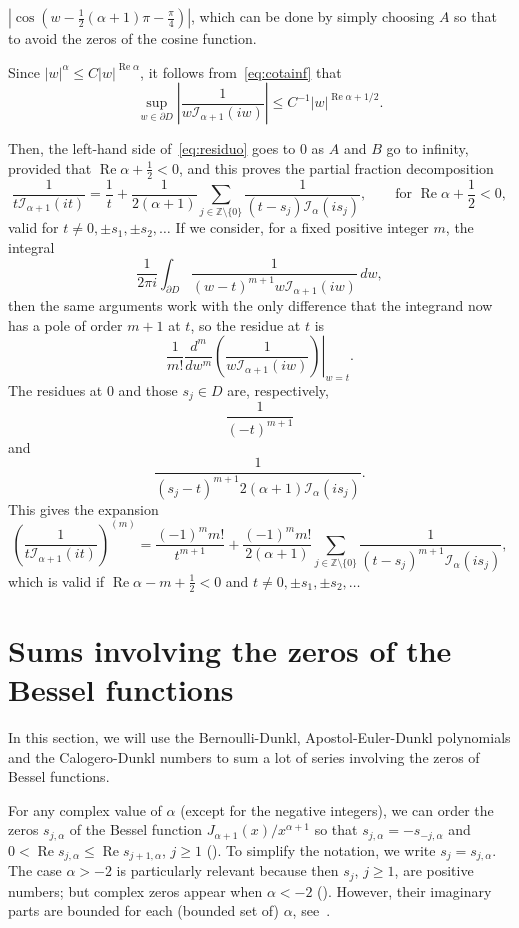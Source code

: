 \documentclass[10pt,a4paper]{article}
\theoremstyle{plain}
\theoremstyle{definition}
\numberwithin{equation}{section} %
\newcommand{\I}{\mathcal{I}}
\newcommand{\ZZO}{\mathbb{Z} \setminus \{0\}}
\renewcommand{\Re}{\operatorname{Re}}
\begin{document}
$|\cos (w-\frac{1}{2}(\alpha+1)\pi - \frac{\pi}{4})|$,
which can be done by simply choosing $A$ so that to avoid the zeros of the cosine function.

Since $|w|^\alpha \leq C|w|^{\Re \alpha}$, it follows from~\eqref{eq:cotainf} that
\[
   \sup_{w \in \partial D} \left|
   \frac{1}{w \I_{\alpha+1}(iw)} \right|
   \leq C^{-1} |w|^{\Re\alpha+1/2}.
\]

Then, the left-hand side of~\eqref{eq:residuo} goes to $0$ as $A$ and $B$ go to infinity, provided that $\Re\alpha + \frac{1}{2} < 0$, and this proves the partial fraction decomposition
\[
   \frac{1}{t \I_{\alpha+1}(it)} = \frac{1}{t}
   + \frac{1}{2(\alpha+1)}
   \sum_{j \in \ZZO}
   \frac{1}{(t - s_j) \I_{\alpha}(is_j)},
   \qquad \text{for } \Re\alpha + \frac{1}{2} < 0,
\]
valid for $t \not= 0, \pm s_1, \pm s_2, \dots$
If we consider, for a fixed positive integer $m$, the integral
\[
   \frac{1}{2\pi i} \int_{\partial D}
   \frac{1}{(w-t)^{m+1} w \I_{\alpha+1}(iw)} \, dw,
\]
then the same arguments work with the only difference that the integrand now has a pole of order $m+1$ at $t$, so the residue at $t$ is
\[
   \frac{1}{m!} \left.\frac{d^m}{d w^m} \left(
   \frac{1}{w \I_{\alpha+1}(iw)} \right) \right|_{w=t}.
\]
The residues at $0$ and those $s_j \in D$ are, respectively,
\[
    \frac{1}{(-t)^{m+1}}
\]
and
\[
   \frac{1}{(s_j - t)^{m+1} 2(\alpha+1) \I_{\alpha}(is_j)}.
\]
This gives the expansion
\begin{equation}
\label{eq:pfd2}
 \left(
   \frac{1}{t \I_{\alpha+1}(it)} \right) ^{(m)}
   = \frac{(-1)^m m!}{t^{m+1}}
   + \frac{(-1)^m m!}{2(\alpha+1)}
   \sum_{j \in \ZZO}
   \frac{1}{(t - s_j)^{m+1} \I_{\alpha}(is_j)},
\end{equation}
which is valid if $\Re\alpha - m + \frac{1}{2} < 0$ and $t \not= 0, \pm s_1, \pm s_2, \dots$

\section{Sums involving the zeros of the Bessel functions}
\label{sec:serieszeros}

In this section, we will use the Bernoulli-Dunkl, Apostol-Euler-Dunkl polynomials and the Calogero-Dunkl numbers to sum a lot of series involving the zeros of Bessel functions.

For any complex value of $\alpha$ (except for the negative integers), we can order the zeros $s_{j,\alpha}$ of the Bessel function $J_{\alpha+1}(x)/x^{\alpha+1}$ so that $s_{j,\alpha}=-s_{-j,\alpha}$ and $0<\Re s_{j,\alpha}\le \Re s_{j+1,\alpha}$, $j\ge 1$ (\cite[\S\,15.41, p.~497]{Wat}). To simplify the notation, we write $s_j=s_{j,\alpha}$.
The case $\alpha>-2$ is particularly relevant because then $s_j$, $j\ge 1$, are positive numbers; but complex zeros appear when $\alpha<-2$ (\cite[\S\,15.27, p.~483]{Wat}). However, their imaginary parts are bounded for each (bounded set of) $\alpha$, see~\cite[\S\,15.4, p.~497]{Wat}.
\end{document}
